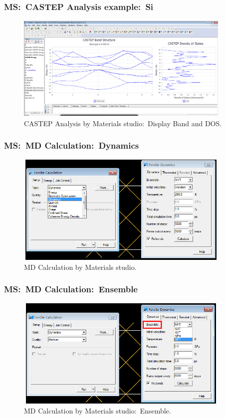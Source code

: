 \frame
{
	\frametitle{\textrm{MS:~CASTEP Analysis example:~Si}}
\begin{figure}[h!]
\centering
\includegraphics[height=2.00in,width=4.05in,viewport=0 0 1529 749,clip]{Figures/MS-CASTEP-14-Si-Analysis-Band_DOS.png}
\caption{\tiny \textrm{CASTEP Analysis by Materials studio:~Display Band and DOS.}}%
\label{MS-CASTEP-Analysis-display-Band_DOS}
\end{figure}
}

\frame
{
	\frametitle{\textrm{MS:~MD Calculation:~Dynamics}}
\begin{figure}[h!]
\centering
\includegraphics[height=2.10in,width=4.05in,viewport=0 0 724 381,clip]{Figures/MS-MD-Dynamics.png}
\caption{\tiny \textrm{MD Calculation by Materials studio.}}%
\label{MS-MD-Dynamics}
\end{figure}
}

\frame
{
	\frametitle{\textrm{MS:~MD Calculation:~Ensemble}}
\begin{figure}[h!]
\centering
\includegraphics[height=2.10in,width=4.05in,viewport=0 0 723 382,clip]{Figures/MS-MD-ensemble.png}
\caption{\tiny \textrm{MD Calculation by Materials studio:~Ensemble.}}%
\label{MS-MD-Dynamics-Ensemble}
\end{figure}
}

